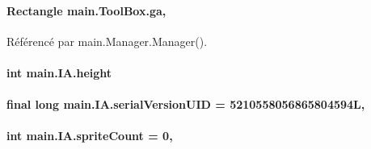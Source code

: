 \paragraph[{ga}]{\setlength{\rightskip}{0pt plus 5cm}Rectangle main.\+Tool\+Box.\+ga\hspace{0.3cm}{\ttfamily [static]}, {\ttfamily [inherited]}}\label{classmain_1_1ToolBox_ab1c5162cc4718a5e4b51430dc6ea7d66}


Référencé par main.\+Manager.\+Manager().

\hypertarget{classmain_1_1IA_a6bef9c3d6ca423025cd8ce08afe5a6a4}{}
\paragraph[{height}]{\setlength{\rightskip}{0pt plus 5cm}int main.\+I\+A.\+height\hspace{0.3cm}{\ttfamily [private]}}\label{classmain_1_1IA_a6bef9c3d6ca423025cd8ce08afe5a6a4}
\hypertarget{classmain_1_1IA_a428eadbb58971a343f8848dea57e5cf3}{}
\paragraph[{serial\+Version\+U\+I\+D}]{\setlength{\rightskip}{0pt plus 5cm}final long main.\+I\+A.\+serial\+Version\+U\+I\+D = 5210558056865804594\+L\hspace{0.3cm}{\ttfamily [static]}, {\ttfamily [private]}}\label{classmain_1_1IA_a428eadbb58971a343f8848dea57e5cf3}
\hypertarget{classmain_1_1IA_a68c9de6cac561ba82fedfd386c10677e}{}
\paragraph[{sprite\+Count}]{\setlength{\rightskip}{0pt plus 5cm}int main.\+I\+A.\+sprite\+Count = 0\hspace{0.3cm}{\ttfamily [static]}, {\ttfamily [private]}}\label{classmain_1_1IA_a68c9de6cac561ba82fedfd386c10677e}
\hypertarget{classmain_1_1IA_a0c7ba08450493f98e01cf13812b24bda}{}
